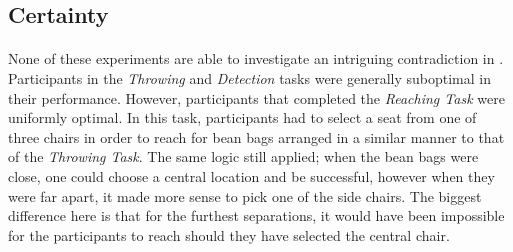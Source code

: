 \documentclass[12pt]{article}
\begin{document}
%
\subsection*{Certainty}
\paragraph{} None of these experiments are able to investigate an intriguing contradiction in \cite{clarke2015failure}. Participants in the \textit{Throwing} and \textit{Detection} tasks were generally suboptimal in their performance. However, participants that completed the \textit{Reaching Task} were uniformly optimal. In this task, participants had to select a seat from one of three chairs in order to reach for bean bags arranged in a similar manner to that of the \textit{Throwing Task}. The same logic still applied; when the bean bags were close, one could choose a central location and be successful, however when they were far apart, it made more sense to pick one of the side chairs. The biggest difference here is that for the furthest separations, it would have been impossible for the participants to reach should they have selected the central chair. 
\end{document}
